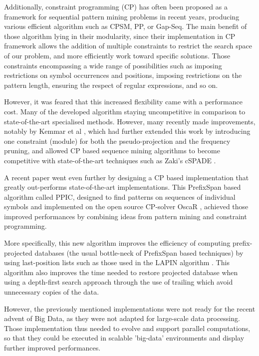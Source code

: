 \documentclass{eplmastersthesis}
\begin{document}
Additionally, constraint programming (CP) has often been proposed as a framework for sequential pattern mining problems in recent years, producing various efficient algorithm such as CPSM, PP, or Gap-Seq. The main benefit of those algorithm lying in their modularity, since their implementation in CP framework allows the addition of multiple constraints to restrict the search space of our problem, and more efficiently work toward specific solutions. Those constraints encompassing a wide range of possibilities such as imposing restrictions on symbol occurrences and positions, imposing restrictions on the pattern length, ensuring the respect of regular expressions, and so on. \newline

However, it was feared that this increased flexibility came with a performance cost. Many of the developed algorithm staying uncompetitive in comparison to state-of-the-art specialised methods.
However, many recently made improvements, notably by Kemmar et al \cite{Kemmar_global, Kemmar_gap}, which had further extended this work by introducing one constraint (module) for both the pseudo-projection and the frequency pruning, and allowed CP based sequence mining algorithms to become competitive with state-of-the-art techniques such as Zaki's cSPADE \cite{zaki2001spade}. \newline

A recent paper \cite{aoga2016efficient} went even further by designing a CP based implementation that greatly out-performs state-of-the-art implementations. This PrefixSpan based algorithm called PPIC, designed to find patterns on sequences of individual symbols and implemented on the open source CP-solver OscaR \cite{oscar}, achieved those improved performances by combining ideas from pattern
mining and constraint programming. \newline

More specifically, this new algorithm improves the efficiency of computing prefix-projected databases (the usual bottle-neck of PrefixSpan based techniques) by using last-position lists such as those used in the LAPIN algorithm \cite{yang2007lapin}. This algorithm also improves the time needed to restore projected database when using a depth-first search approach through the use of trailing which avoid unnecessary copies of the data. \newline

However, the previously mentioned implementations were not ready for the recent advent of Big Data, as they were not adapted for large-scale data processing. Those implementation thus needed to evolve and support parallel computations, so that they could be executed in scalable 'big-data' environments and display further improved performances. \newline
\end{document}
